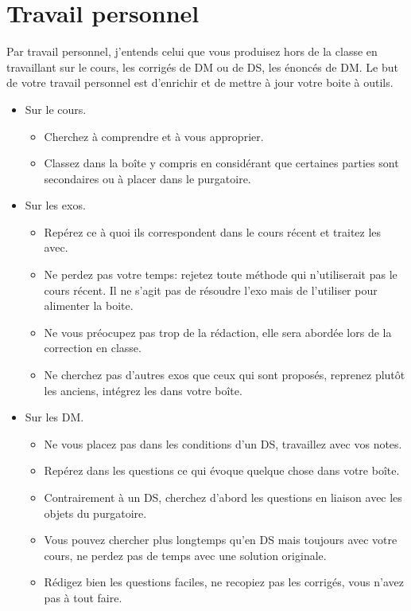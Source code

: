 \section{Travail personnel}
Par travail personnel, j'entends celui que vous produisez hors de la classe en travaillant sur le cours, les corrigés de DM ou de DS, les énoncés de DM.\newline
Le but de votre travail personnel est d'enrichir et de mettre à jour votre boite à outils. \bigskip
\begin{itemize}
 \item Sur le cours. 
 \begin{itemize}
 \item Cherchez à comprendre et à vous approprier.
 \item Classez dans la boîte y compris en considérant que certaines parties sont secondaires ou à placer dans le purgatoire.
 \end{itemize}
 
 \item Sur les exos. 
 \begin{itemize}
 \item Repérez ce à quoi ils correspondent dans le cours récent et traitez les avec.
 \item Ne perdez pas votre temps: rejetez toute méthode qui n'utiliserait pas le cours récent. Il ne s'agit pas de résoudre l'exo mais de l'utiliser pour alimenter la boite. 
 \item Ne vous préocupez pas trop de la rédaction, elle sera abordée lors de la correction en classe.
 \item Ne cherchez pas d'autres exos que ceux qui sont proposés, reprenez plutôt les anciens, intégrez les dans votre boîte.
 \end{itemize}
 
 \item Sur les DM.
 \begin{itemize}
 \item Ne vous placez pas dans les conditions d'un DS, travaillez avec vos notes. 
 \item Repérez dans les questions ce qui évoque quelque chose dans votre boîte. 
 \item Contrairement à un DS, cherchez d'abord les questions en liaison avec les objets du purgatoire. 
 \item Vous pouvez chercher plus longtemps qu'en DS mais toujours avec votre cours, ne perdez pas de temps avec une solution originale. 
 \item Rédigez bien les questions faciles, ne recopiez pas les corrigés, vous n'avez pas à tout faire.
 \end{itemize}
 

\end{itemize}
